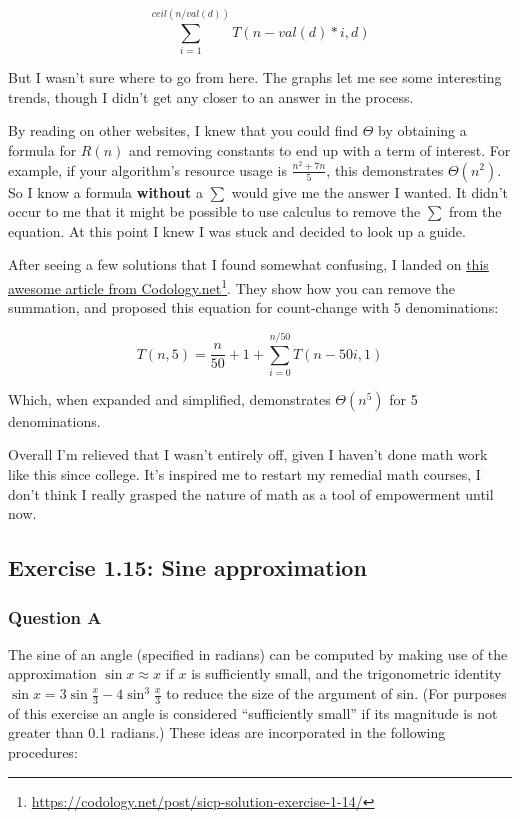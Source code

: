 \documentclass[final,fleqn,titlepage,twoside]{article}
\begin{document}
\[
\sum_{i=1}^{ceil(n / val(d))} T(n - val(d)*i, d)
\]

But I wasn't sure where to go from here. The graphs let me see some interesting
trends, though I didn't get any closer to an answer in the process.

By reading on other websites, I knew that you could find \(\Theta\) by obtaining
a formula for \(R(n)\) and removing constants to end up with a term of interest.
For example, if your algorithm's resource usage is \(\frac{n^{2} + 7n}{5}\),
this demonstrates \(\Theta(n^{2})\). So I know a formula \textbf{without} a \(\sum\)
would give me the answer I wanted. It didn't occur to me that it might be
possible to use calculus to remove the \(\sum\) from the equation. At this point
I knew I was stuck and decided to look up a guide.

After seeing a few solutions that I found somewhat confusing, I landed on \href{https://codology.net/post/sicp-solution-exercise-1-14/}{this
awesome article from Codology.net}\footnote{\url{https://codology.net/post/sicp-solution-exercise-1-14/}}. They show how you can
remove the summation, and proposed this equation for count-change with 5
denominations:

\[
T(n,5)=\frac n{50}+1+\sum_{i=0}^{n/50}T(n-50i,1)
\]

Which, when expanded and simplified, demonstrates \(\Theta(n^{5})\) for 5
denominations.

Overall I'm relieved that I wasn't entirely off, given I haven't done math work
like this since college. It's inspired me to restart my remedial math courses, I
don't think I really grasped the nature of math as a tool of empowerment until
now.

\subsection{Exercise 1.15: Sine approximation}
\label{sec:orgbb090eb}
\subsubsection{Question A}
\label{sec:org002a033}
The sine of an angle (specified in radians) can be computed by making use of the
approximation \(\sin x \approx x\) if \(x\) is sufficiently small, and the
trigonometric identity \(\sin x = 3\sin\frac{x}{3} - 4\sin^3\frac{x}{3}\)
to reduce the size of the argument of sin. (For purposes of this exercise an
angle is considered ``sufficiently small'' if its magnitude is not greater than
0.1 radians.) These ideas are incorporated in the following procedures:
\end{document}

